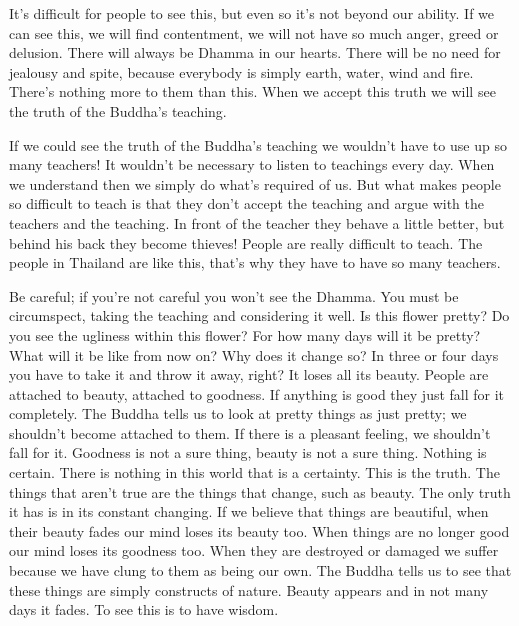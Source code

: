 It's difficult for people to see this, but even so it's not beyond our ability. If we can see this, we will find contentment, we will not have so much anger, greed or delusion. There will always be Dhamma in our hearts. There will be no need for jealousy and spite, because everybody is simply earth, water, wind and fire. There's nothing more to them than this. When we accept this truth we will see the truth of the Buddha's teaching. 

If we could see the truth of the Buddha's teaching we wouldn't have to use up so many teachers! It wouldn't be necessary to listen to teachings every day. When we understand then we simply do what's required of us. But what makes people so difficult to teach is that they don't accept the teaching and argue with the teachers and the teaching. In front of the teacher they behave a little better, but behind his back they become thieves! People are really difficult to teach. The people in Thailand are like this, that's why they have to have so many teachers. 

Be careful; if you're not careful you won't see the Dhamma. You must be circumspect, taking the teaching and considering it well. Is this flower pretty? Do you see the ugliness within this flower? For how many days will it be pretty? What will it be like from now on? Why does it change so? In three or four days you have to take it and throw it away, right? It loses all its beauty. People are attached to beauty, attached to goodness. If anything is good they just fall for it completely. The Buddha tells us to look at pretty things as just pretty; we shouldn't become attached to them. If there is a pleasant feeling, we shouldn't fall for it. Goodness is not a sure thing, beauty is not a sure thing. Nothing is certain. There is nothing in this world that is a certainty. This is the truth. The things that aren't true are the things that change, such as beauty. The only truth it has is in its constant changing. If we believe that things are beautiful, when their beauty fades our mind loses its beauty too. When things are no longer good our mind loses its goodness too. When they are destroyed or damaged we suffer because we have clung to them as being our own. The Buddha tells us to see that these things are simply constructs of nature. Beauty appears and in not many days it fades. To see this is to have wisdom. 

